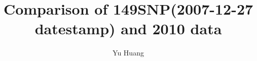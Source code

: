 \documentclass[a3paper,10pt]{article}
\title{Comparison of 149SNP(2007-12-27 datestamp) and 2010 data}
\author{Yu Huang}
\begin{document}
\maketitle

\begin{abstract}

\end{abstract}

\tableofcontents




\end{document}
